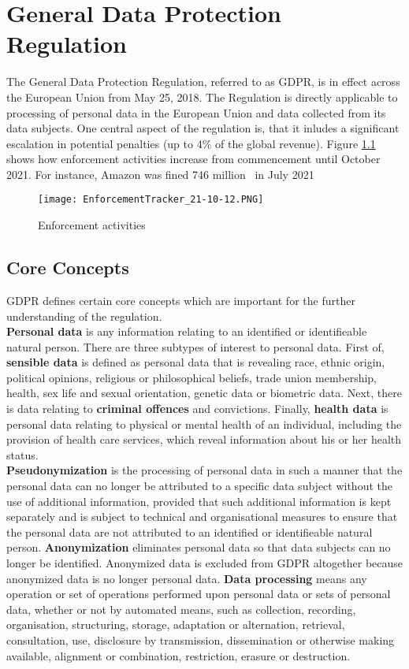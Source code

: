 \documentclass[a4paper,12pt]{report}
\begin{document}
	\chapter{General Data Protection Regulation}
	The General Data Protection Regulation, referred to as GDPR, is in effect across the European Union from May 25, 2018.
	The Regulation is directly applicable to processing of personal data in the European Union and data collected from its data subjects.
	One central aspect of the regulation is, that it inludes a significant escalation in potential penalties (up to 4\% of the global revenue).
	Figure \ref{fig:enforcement_tracker} shows how enforcement activities increase from commencement until October 2021.
	For instance, Amazon was fined 746 million \texteuro \ in July 2021 \cite{EnforcementTracker}
	\begin{figure}
		\texttt{[image: EnforcementTracker\_21-10-12.PNG]}
		\caption{Enforcement activities \cite{EnforcementTracker}}
		\label{fig:enforcement_tracker}
	\end{figure}
	
	\section{Core Concepts}
	\startsection
	GDPR defines certain core concepts which are important for the further understanding of the regulation.\\
	\textbf{Personal data} is any information relating to an identified or identifieable natural person.
	There are three subtypes of interest to personal data. 
	First of, \textbf{sensible data} is defined as personal data that is revealing race, ethnic origin, political opinions, religious or philosophical beliefs, trade union membership, health, sex life and sexual orientation, genetic data or biometric data.
	Next, there is data relating to \textbf{criminal offences} and convictions.
	Finally, \textbf{health data} is personal data relating to physical or mental health of an individual, including the provision of health care services, which reveal information about his or her health status.\\
	\textbf{Pseudonymization} is the processing of personal data in such a manner that the personal data can no longer be attributed to a specific data subject without the use of additional information, provided that such additional information is kept separately and is subject to technical and organisational measures to ensure that the personal data are not attributed to an identified or identifieable natural person.
	\textbf{Anonymization} eliminates personal data so that data subjects can no longer be identified. 
	Anonymized data is excluded from GDPR altogether because anonymized data is no longer personal data.
	\textbf{Data processing} means any operation or set of operations performed upon personal data or sets of personal data, whether or not by automated means, such as collection, recording, organisation, structuring, storage, adaptation or alternation, retrieval, consultation, use, disclosure by transmission, dissemination or otherwise making available, alignment or combination, restriction, erasure or destruction.
	\closesection
\end{document}
